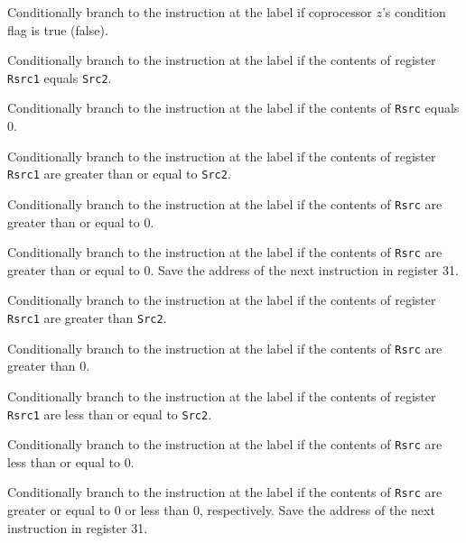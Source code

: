 \documentclass[11pt]{article}
\begin{document}
Conditionally branch to the instruction at the label if coprocessor
$z$'s condition flag is true (false).

Conditionally branch to the instruction at the label if the contents
of register {\tt Rsrc1} equals {\tt Src2}.

Conditionally branch to the instruction at the label if the contents
of {\tt Rsrc} equals 0.

Conditionally branch to the instruction at the label if the contents
of register {\tt Rsrc1} are greater than or equal to {\tt Src2}.

Conditionally branch to the instruction at the label if the contents
of {\tt Rsrc} are greater than or equal to 0.

Conditionally branch to the instruction at the label if the contents
of {\tt Rsrc} are greater than or equal to 0. Save the address of
the next instruction in register 31.

Conditionally branch to the instruction at the label if the contents
of register {\tt Rsrc1} are greater than {\tt Src2}.

Conditionally branch to the instruction at the label if the contents
of {\tt Rsrc} are greater than 0.

Conditionally branch to the instruction at the label if the contents
of register {\tt Rsrc1} are less than or equal to {\tt Src2}.

Conditionally branch to the instruction at the label if the contents
of {\tt Rsrc} are less than or equal to 0.

Conditionally branch to the instruction at the label if the contents
of {\tt Rsrc} are greater or equal to 0 or less than 0,
respectively. Save the address of the next instruction in register 31.
\end{document}
